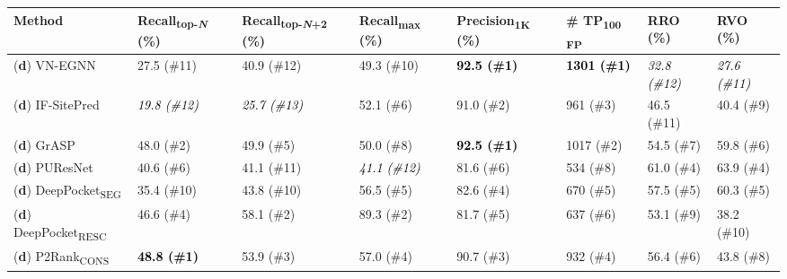 \begingroup
\captionsetup{belowskip=0pt,aboveskip=9pt} %
\begin{landscape}
\begin{longtable}[c]{|M{29mm}|M{29mm}|M{31mm}|M{27mm}|M{30mm}|M{19mm}|M{18mm}|M{18mm}|}
\hline
\textbf{Method}         & \textbf{Recall\textsubscript{top-\textit{N}}} (\%) & \textbf{Recall\textsubscript{top-\textit{N}+2}} (\%) & \textbf{Recall\textsubscript{max}} (\%) & \textbf{Precision\textsubscript{1K}} (\%) & \textbf{\# TP\textsubscript{100 FP}} & \textbf{RRO} (\%) & \textbf{RVO} (\%) \\ \hline
\endfirsthead
%
\footnotesize{(\textbf{d})} VN-EGNN        & 27.5 (\#11)           & 40.9 (\#12)             & 49.3 (\#10)         & \textbf{\textcolor{black}{92.5 (\#1)}}                   & \textbf{\textcolor{black}{1301 (\#1)}}               & \textit{\textcolor{black}{32.8 (\#12)}}             & \textit{\textcolor{black}{27.6 (\#11)}}             \\ \hline
\footnotesize{(\textbf{d})} IF-SitePred    & \textit{\textcolor{black}{19.8 (\#12) }}           & \textit{\textcolor{black}{25.7 (\#13)}}             & 52.1 (\#6)         & 91.0 (\#2)             & 961 (\#3)         & 46.5 (\#11)     & 40.4 (\#9)     \\ \hline
\footnotesize{(\textbf{d})} GrASP          & 48.0 (\#2)              & 49.9 (\#5)             & 50.0 (\#8)           & \textbf{\textcolor{black}{92.5 (\#1)}}                   & 1017 (\#2)       & 54.5 (\#7)     & 59.8 (\#6)     \\ \hline
\footnotesize{(\textbf{d})} PUResNet       & 40.6 (\#6)            & 41.1 (\#11)             & \textit{\textcolor{black}{41.1 (\#12)}}         & 81.6 (\#6)           & 534 (\#8)         & 61.0 (\#4)     & 63.9 (\#4)     \\ \hline
\footnotesize{(\textbf{d})} DeepPocket\textsubscript{SEG}  & 35.4 (\#10)            & 43.8 (\#10)             & 56.5 (\#5)         & 82.6 (\#4)           & 670 (\#5)         & 57.5 (\#5)     & 60.3 (\#5)     \\ \hline
\footnotesize{(\textbf{d})} DeepPocket\textsubscript{RESC} & 46.6 (\#4)            & 58.1 (\#2)                     & 89.3 (\#2)         & 81.7 (\#5)          & 637 (\#6)         & 53.1 (\#9)     & 38.2 (\#10)     \\ \hline
\footnotesize{(\textbf{d})} P2Rank\textsubscript{CONS}     & \textbf{\textcolor{black}{48.8 (\#1)}}           & 53.9 (\#3)             & 57.0 (\#4)           & 90.7 (\#3)           & 932 (\#4)         & 56.4 (\#6)     & 43.8 (\#8)     \\ \hline

\end{longtable}
\end{landscape}
